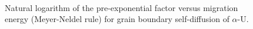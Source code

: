 \documentclass[review]{elsarticle}
\begin{document}
\begin{figure}[h!]
\centering
{}\\
\caption{Natural logarithm of the pre-exponential factor versus migration energy (Meyer-Neldel rule) for grain boundary self-diffusion of $\alpha$-U.}
\label{fig:compan}
\end{figure}




\end{document}
